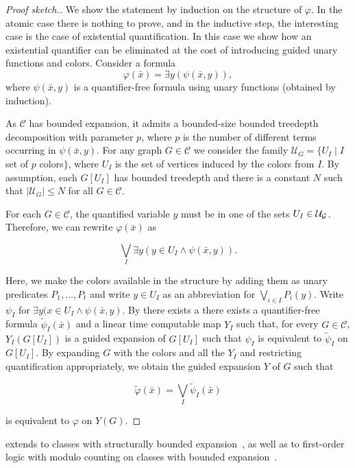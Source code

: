\documentclass[1p,number,a4paper]{elsarticle}
\theoremstyle{remark}
\newcommand{\Cc}{\mathscr{C}}
\newcommand{\Uu}{\mathcal{U}}
\renewcommand{\phi}{\varphi}
\begin{document}
\begin{proof}[Proof sketch.]
    We show the statement by induction on the structure of $\varphi$. 
    In the atomic case there is nothing to prove, and in the inductive step, the interesting case is the case of existential quantification. 
    In this case we show how an existential quantifier can be eliminated at the cost of introducing guided unary functions and colors. 
    Consider a formula \[\phi(\bar x)=\exists y(\psi(\bar x,y)),\] where
    $\psi(\bar x,y)$ is a quantifier-free formula
    using unary functions (obtained by induction). 
  
    As $\Cc$ has bounded expansion, it admits a bounded-size bounded treedepth decomposition with parameter $p$, where $p$ is the number of different terms occurring in $\psi(\bar x,y)$.
    For any graph $G\in \Cc$
    we consider the family $\Uu_G=\{U_I \mid I$ set of $p$ colors$\}$, where $U_I$ is the set of vertices induced by the colors from $I$. 
    By assumption, each $G[U_I]$ has bounded treedepth and there is a constant $N$ such that $|\Uu_G|\leq N$ for all $G\in \Cc$.
    
    For each $G\in\Cc$, the quantified variable $y$ must be in one of the sets $U_I\in \cal U_G$. 
    Therefore, we can rewrite 
    $\phi(\bar x)$ as 

    \[\bigvee_{I}\exists y (y\in U_I\wedge \psi(\bar x,y)).\]

    Here, we make the colors available in the structure by adding them as unary predicates $P_1,\ldots, P_t$ and write $y\in U_I$ as an abbreviation for $\bigvee_{i\in I}P_i(y)$. 
    Write $\psi_I$ for $\exists y (x\in U_I\wedge \psi(\bar x,y)$. 
    By  there exists a 
    there exists a quantifier-free formula $\tilde\psi_I(\bar x)$ and a 
    linear time computable map $Y_I$ such that, for every $G\in\Cc$, $Y_I(G[U_I])$ is a guided expansion of $G[U_I]$ such that $\psi_I$ is equivalent to $\tilde\psi_I$ on $G[U_I]$. 
    By expanding $G$ with the colors and all the $Y_I$ and restricting quantification appropriately, 
    we obtain the guided expansion $Y$ of $G$ such that 

    \[\tilde\phi(\bar x) = \bigvee_{I} \tilde\psi_I(\bar x)\]

    is equivalent to $\phi$ on $Y(G)$. 
\end{proof}

 extends to classes with structurally bounded expansion~\cite{gajarsky2020first}, as well as to first-order logic with modulo counting on classes with bounded expansion~\cite{nevsetvril2023modulo}. 
\end{document}
